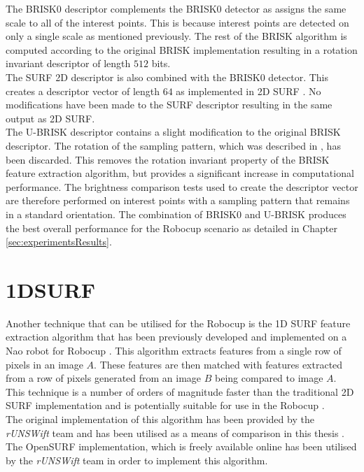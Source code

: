 \documentclass[11pt]{report}
\begin{document}
The BRISK0 descriptor complements the BRISK0 detector as assigns the same scale to all of the interest points. This is because interest points are detected on only a single scale as mentioned previously. The rest of the BRISK algorithm is computed according to the original BRISK implementation resulting in a rotation invariant descriptor of length $512$ bits\cite{Leutenegger2011}.\\

The SURF 2D descriptor is also combined with the BRISK0 detector. This creates a descriptor vector of length $64$ as implemented in 2D SURF \cite{Bay2008}. No modifications have been made to the SURF descriptor resulting in the same output as 2D SURF.\\ 

The U-BRISK descriptor contains a slight modification to the original BRISK descriptor. The rotation of the sampling pattern, which was described in , has been discarded. This removes the rotation invariant property of the BRISK feature extraction algorithm, but provides a significant increase in computational performance. The brightness comparison tests used to create the descriptor vector are therefore performed on interest points with a sampling pattern that remains in a standard orientation. The combination of BRISK0 and U-BRISK produces the best overall performance for the Robocup scenario as detailed in Chapter \ref{sec:experimentsResults}. \\

\section{1DSURF}
\label{sec:1dsurf}
Another technique that can be utilised for the Robocup is the 1D SURF feature extraction algorithm that has been previously developed and implemented on a Nao robot for Robocup \cite{Anderson}. This algorithm extracts features from a single row of pixels in an image $A$. These features are then matched with features extracted from a row of pixels generated from an image $B$ being compared to image $A$. This technique is a number of orders of magnitude faster than the traditional 2D SURF implementation and is potentially suitable for use in the Robocup \cite{Anderson}.\\

The original implementation of this algorithm has been provided by the \textit{rUNSWift} team and has been utilised as a means of comparison in this thesis \cite{Anderson}. The OpenSURF implementation, which is freely available online \cite{opensurf} has been utilised by the \textit{rUNSWift} team in order to implement this algorithm.\\
\end{document}
